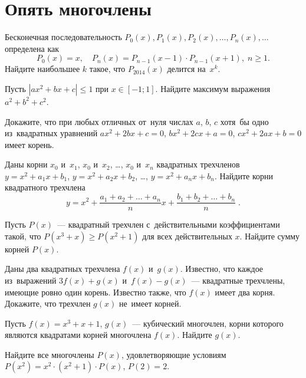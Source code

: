 
\section*{Опять многочлены}


\begin{problems}

\item
Бесконечная последовательность
$P_0(x), P_1(x), P_2(x), \ldots, P_n(x), \ldots$
определена как
\[
    P_0(x) = x
,\quad
    P_n(x) = P_{n-1}(x - 1) \cdot P_{n-1}(x + 1)
,\;
    n \geq 1
.\]
Найдите наибольшее $k$ такое, что $P_{2014}(x)$ делится на~$x^k$.

\item
Пусть $|a x^2 + b x + c| \leq 1$ при $x \in [-1; 1]$.
Найдите максимум выражения $a^2 + b^2 + c^2$.

\item
Докажите, что при любых отличных от~нуля числах $a$, $b$, $c$ хотя~бы одно
из~квадратных уравнений
$a x^2 + 2 b x + c = 0$, $b x^2 + 2 c x + a = 0$, $c x^2 + 2 a x + b = 0$
имеет корень.

\item
Даны корни $x_0$ и~$x_1$, $x_0$ и~$x_2$, \ldots, $x_0$ и~$x_n$ квадратных
трехчленов
$y = x^2 + a_1 x + b_1$, $y = x^2 + a_2 x + b_2$, \ldots,
$y = x^2 + a_n x + b_n$.
Найдите корни квадратного трехчлена
\[
    y
=
    x^2
    +
    \frac{a_1 + a_2 + \ldots + a_n}{n} x
    +
    \frac{b_1 + b_2 + \ldots + b_n}{n}
\;.\]

\item
Пусть $P(x)$~--- квадратный трехчлен с~действительными коэффициентами такой,
что $P(x^3 + x) \geq P(x^2 + 1)$ для всех действительных $x$.
Найдите сумму корней $P(x)$.

\item
Даны два квадратных трехчлена $f(x)$ и~$g(x)$.
Известно, что каждое из~выражений $3 f(x) + g(x)$ и~$f(x) - g(x)$~---
квадратные трехчлены, имеющие ровно один корень.
Известно также, что $f(x)$ имеет два корня.
Докажите, что трехчлен $g(x)$ не~имеет корней.

\item
Пусть $f(x) = x^3 + x + 1$, $g(x)$~--- кубический многочлен, корни которого
являются квадратами корней многочлена $f(x)$.
Найдите $g(x)$.

\item
Найдите все многочлены $P(x)$, удовлетворяющие условиям
$P(x^2) = x^2 \cdot (x^2 + 1) \cdot P(x)$, $P(2) = 2$.

\end{problems}

